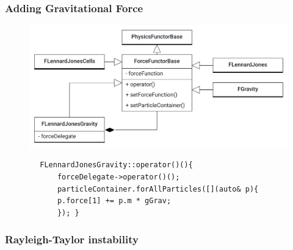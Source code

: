 \begin{frame}[fragile]
	\frametitle{Adding Gravitational Force}
			\begin{figure}
				\centering
				\includegraphics[width=0.6\linewidth]{FGravity_added}
				\label{fig:fgravityadded}
			\end{figure}
			
\begin{lstlisting}
		FLennardJonesGravity::operator()(){
			forceDelegate->operator()();
			particleContainer.forAllParticles([](auto& p){
			p.force[1] += p.m * gGrav;
			});	}
\end{lstlisting}

		
	
	
	
\end{frame}

\begin{frame}
	\frametitle{Rayleigh-Taylor instability}
	\begin{figure}[h!]
		\centering    
	\end{figure} 
\end{frame}

